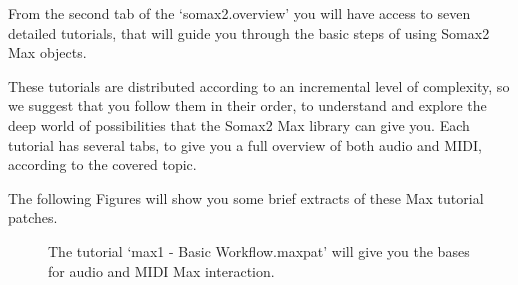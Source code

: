 From the second tab of the `somax2.overview' you will have access to seven detailed tutorials, that will guide you through the basic steps of using Somax2 Max objects. 

These tutorials are distributed according to an incremental level of complexity, so we suggest that you follow them in their order, to understand and explore the deep world of possibilities that the Somax2 Max library can give you.
Each tutorial has several tabs, to give you a full overview of both audio and MIDI, according to the covered topic.

The following Figures will show you some brief extracts of these Max tutorial patches.




\begin{figure}[H]
  \centering
  \hfill
  \caption{The tutorial `max1 - Basic Workflow.maxpat' will give you the bases for audio and MIDI Max interaction.}
\end{figure}

